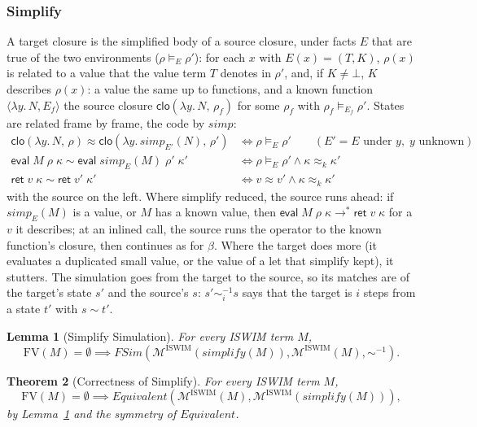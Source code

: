 \documentclass[10pt]{article}
\theoremstyle{acmplain}
\newtheorem{theorem}{Theorem}[section]
\newtheorem{lemma}[theorem]{Lemma}
\newcommand{\key}[1]{\mathsf{#1}}
\newcommand{\pass}[1]{\mathit{#1}}
\newcommand{\lam}[1]{\lambda #1.\,}
\newcommand{\FV}{\mathrm{FV}}
\newcommand{\ev}[3]{\key{eval}\;#1\;#2\;#3}
\newcommand{\rt}[2]{\key{ret}\;#1\;#2}
\newcommand{\Mach}[1]{\mathcal{M}^{#1}}
\newcommand{\Equiv}{\mathit{Equivalent}}
\newcommand{\FSim}{\mathit{FSim}}
\newcommand{\cloV}[2]{\key{clo}(#1,\, #2)}
\newcommand{\lto}{\longrightarrow}
\newcommand{\approxk}{\approx_k}
\begin{document}
\subsubsection{Simplify}\label{sec:sim-simplify}

A target closure is the simplified body of a source closure, under facts
$E$ that are true of the two environments ($\rho \models_E \rho'$): for each
$x$ with $E(x) = (T, K)$, $\rho(x)$ is related to a value that the value term
$T$ denotes in $\rho'$, and, if $K \neq \bot$, $K$ describes $\rho(x)$: a value the same
up to functions, and a known function $\langle \lam{y} N, E_f \rangle$ the source
closure $\cloV{\lam{y} N}{\rho_f}$ for some $\rho_f$ with $\rho_f \models_{E_f} \rho'$.
States are related frame by frame, the code by $\pass{simp}$:
\begin{align*}
  \cloV{\lam{y} N}{\rho} \approx \cloV{\lam{y} \pass{simp}_{E'}(N)}{\rho'}
    &\iff \rho \models_E \rho' \qquad (E' = E \text{ under } y,\; y \text{ unknown}) \\
  \ev{M}{\rho}{\kappa} \sim \ev{\pass{simp}_E(M)}{\rho'}{\kappa'}
    &\iff \rho \models_E \rho' \land \kappa \approxk \kappa' \\
  \rt{v}{\kappa} \sim \rt{v'}{\kappa'} &\iff v \approx v' \land \kappa \approxk \kappa'
\end{align*}
with the source on the left. Where simplify reduced, the source runs ahead:
if $\pass{simp}_E(M)$ is a value, or $M$ has a known value, then
$\ev{M}{\rho}{\kappa} \lto^* \rt{v}{\kappa}$ for a $v$ it describes; at an
inlined call, the source runs the operator to the known function's closure,
then continues as for $\beta$. Where the
target does more (it evaluates a duplicated small value, or the value of a
let that simplify kept), it stutters. The simulation goes from the target
to the source, so its matches are of the target's state $s'$ and the
source's $s$: $s' \mathrel{\sim^{-1}_i} s$ says that the target is $i$ steps from a
state $t'$ with $s \sim t'$.

\begin{lemma}[Simplify Simulation]\label{lem:simplify-fsim}
For every ISWIM term $M$,
\[
  \FV(M) = \emptyset \implies
  \FSim(\Mach{\mathrm{ISWIM}}(\pass{simplify}(M)), \Mach{\mathrm{ISWIM}}(M), \sim^{-1}) .
\]
\end{lemma}

\begin{theorem}[Correctness of Simplify]\label{thm:simplify-correct}
For every ISWIM term $M$,
\[
  \FV(M) = \emptyset \implies
  \Equiv(\Mach{\mathrm{ISWIM}}(M), \Mach{\mathrm{ISWIM}}(\pass{simplify}(M))) ,
\]
by Lemma~\ref{lem:simplify-fsim} and the symmetry of $\Equiv$.
\end{theorem}
\end{document}
